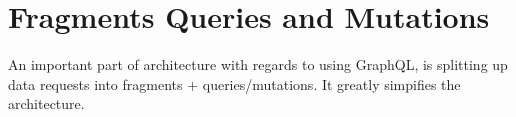 \maketitle{}
\section{ Fragments Queries and Mutations }

An important part of architecture with regards to using GraphQL, is splitting
up data requests into fragments + queries/mutations. It greatly simpifies
the architecture. 
